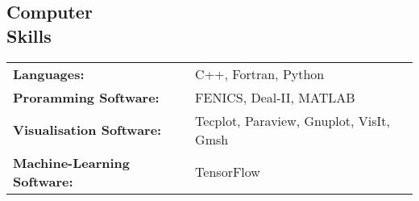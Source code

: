 \documentclass[margin]{res}
\begin{document}
\begin{resume}


\section{Computer \\ Skills}
   \begin{tabular}{l p{3in}}
    {\bf Languages:} & C++, Fortran, Python \\

    {\bf Proramming Software:} &  FENICS, Deal-II, MATLAB \\
    
    {\bf Visualisation Software:} & Tecplot, Paraview, Gnuplot, VisIt, Gmsh \\
    
    {\bf Machine-Learning Software:} & TensorFlow
 \end{tabular}


\end{resume} 
\end{document}
